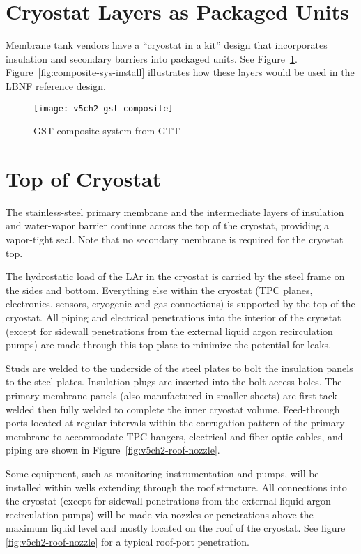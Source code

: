 \section{Cryostat Layers as Packaged Units}
Membrane tank vendors have a ``cryostat in a kit'' design that 
incorporates insulation and secondary barriers into packaged 
units. See Figure~\ref{fig:gst-composite}.  
Figure~\ref{fig:composite-sys-install} illustrates how these 
layers would be used in the LBNF reference design.

\begin{figure}[htbp]
\centering
\texttt{[image: v5ch2-gst-composite]}
\caption{GST composite system from GTT}
\label{fig:gst-composite}
\end{figure}

\section{Top of Cryostat}

The stainless-steel primary membrane and the intermediate layers of 
insulation and water-vapor barrier continue across the top of the 
cryostat, providing a vapor-tight seal.  Note that no secondary 
membrane is required for the cryostat top. 

The hydrostatic load of the LAr in the cryostat is carried by 
the steel frame on the sides and bottom. Everything 
else within the cryostat (TPC planes, electronics, sensors,
cryogenic and gas connections) is supported by the top of the 
cryostat. All piping and electrical penetrations into the 
interior of the cryostat (except for sidewall penetrations from
the external liquid argon recirculation pumps) are made through 
this top plate to minimize the potential for leaks.

Studs are welded to the underside of the steel plates to bolt the 
insulation panels to the steel plates. Insulation plugs are inserted 
into the bolt-access holes.  The primary membrane panels (also 
manufactured in smaller sheets) are first tack-welded then fully 
welded to complete the inner cryostat volume. Feed-through 
ports located at regular intervals within the corrugation pattern
of the primary membrane to accommodate TPC hangers, electrical 
and fiber-optic cables, and piping are
shown in Figure~\ref{fig:v5ch2-roof-nozzle}. 

Some equipment, such as monitoring instrumentation and pumps, 
will be installed within wells extending through the roof 
structure. All connections into the cryostat (except for 
sidewall penetrations from the external liquid argon 
recirculation pumps) will be made 
via nozzles or penetrations above the maximum liquid level 
and mostly located on the roof of the cryostat. See figure 
\ref{fig:v5ch2-roof-nozzle} for a typical roof-port 
penetration.  


